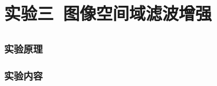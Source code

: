 \documentclass{ctexart}
\begin{document}
\section{\hei 实验三\ 图像空间域滤波增强}
\subsection{\hei }
\subsubsection{\hei 实验原理}
\subsubsection{\hei 实验内容}
\end{document}
